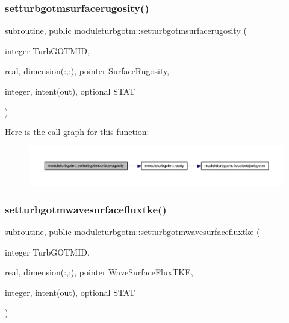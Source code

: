 \subsubsection{\texorpdfstring{setturbgotmsurfacerugosity()}{setturbgotmsurfacerugosity()}}
{\footnotesize\ttfamily subroutine, public moduleturbgotm\+::setturbgotmsurfacerugosity (\begin{DoxyParamCaption}\item[{integer}]{Turb\+G\+O\+T\+M\+ID,  }\item[{real, dimension(\+:,\+:), pointer}]{Surface\+Rugosity,  }\item[{integer, intent(out), optional}]{S\+T\+AT }\end{DoxyParamCaption})}

Here is the call graph for this function\+:\nopagebreak
\begin{figure}[H]
\begin{center}
\leavevmode
\includegraphics[width=350pt]{namespacemoduleturbgotm_ac71371400c754c4786f6914ccc6d6c70_cgraph}
\end{center}
\end{figure}
\mbox{\label{namespacemoduleturbgotm_a868b912c54f8467afdf5608913e56f87}} 
\subsubsection{\texorpdfstring{setturbgotmwavesurfacefluxtke()}{setturbgotmwavesurfacefluxtke()}}
{\footnotesize\ttfamily subroutine, public moduleturbgotm\+::setturbgotmwavesurfacefluxtke (\begin{DoxyParamCaption}\item[{integer}]{Turb\+G\+O\+T\+M\+ID,  }\item[{real, dimension(\+:,\+:), pointer}]{Wave\+Surface\+Flux\+T\+KE,  }\item[{integer, intent(out), optional}]{S\+T\+AT }\end{DoxyParamCaption})}

